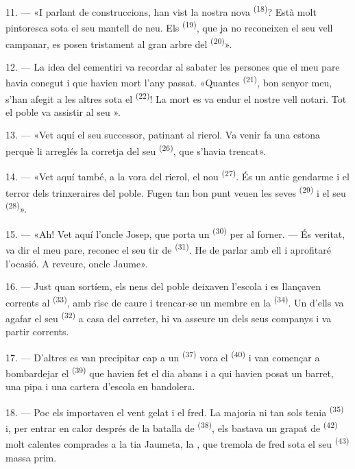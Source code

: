 11. --- «I parlant de construccions, han vist la nostra nova 
\textsuperscript{(18)}? Està molt pintoresca sota el seu mantell de neu. Els
 \textsuperscript{(19)}, que ja no reconeixen el seu vell campanar,
es posen tristament al gran arbre del  \textsuperscript{(20)}».

12. --- La idea del cementiri va recordar al sabater les persones que el meu pare havia
conegut i que havien mort l'any passat. «Quantes  \textsuperscript{(21)}, bon
senyor meu, s'han afegit a les altres sota el
 \textsuperscript{(22)}! La mort es va endur el nostre vell notari.
Tot el poble va assistir al seu ».

13. --- «Vet aquí el seu successor, patinant al rierol. Va venir fa una estona perquè li
arreglés la corretja del seu  \textsuperscript{(26)}, que s'havia trencat».

14. --- «Vet aquí també, a la vora del rierol, el nou 
\textsuperscript{(27)}. És un antic gendarme i el terror dels trinxeraires del poble. Fugen
tan bon punt veuen les seves  \textsuperscript{(29)} i el seu 
\textsuperscript{(28)}».

15. --- «Ah! Vet aquí l'oncle Josep, que porta un 
\textsuperscript{(30)} per al forner. --- És veritat, va dir el meu pare, reconec el seu tir
de  \textsuperscript{(31)}. He de parlar amb ell i aprofitaré l'ocasió. A
reveure, oncle Jaume».

16. --- Just quan sortíem, els nens del poble deixaven l'escola i es llançaven corrents al
 \textsuperscript{(33)}, amb risc de caure i trencar-se un membre en la
 \textsuperscript{(34)}. Un d'ells va agafar el seu 
\textsuperscript{(32)} a casa del carreter, hi va asseure un dels seus companys i va partir
corrents.

17. --- D'altres es van precipitar cap a un  \textsuperscript{(37)} vora
el  \textsuperscript{(40)} i van començar a bombardejar el 
\textsuperscript{(39)} que havien fet el dia abans i a qui havien posat un barret, una pipa i
una cartera d'escola en bandolera.

18. --- Poc els importaven el vent gelat i el fred. La majoria ni tan sols tenia
 \textsuperscript{(35)} i, per entrar en calor després de la
batalla de  \textsuperscript{(38)}, els bastava un grapat de
 \textsuperscript{(42)} molt calentes comprades a la tia Jaumeta,
la , que tremola de fred sota el seu  \textsuperscript{(43)}
massa prim.

